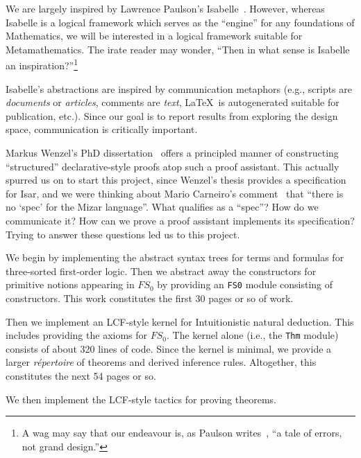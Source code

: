 \begin{node}
We are largely inspired by Lawrence Paulson's Isabelle~\cite{paulson1989foundation,paulson1990isabelle,paulson1994isabelle}.
However, whereas Isabelle is a logical framework which serves as the
``engine'' for any foundations of Mathematics, we will be interested
in a logical framework suitable for Metamathematics. The irate reader
may wonder, ``Then in what sense is Isabelle an
inspiration?''\footnote{A wag may say that our endeavour is, as
Paulson writes~\cite{paulson1990isabelle}, ``a tale of errors, not grand design.''}

Isabelle's abstractions are inspired by communication metaphors (e.g.,
scripts are \emph{documents} or \emph{articles}, comments are \emph{text}, 
\LaTeX\ is autogenerated suitable for publication, etc.). Since our
goal is to report results from exploring the design space,
communication is critically important.

Markus Wenzel's PhD dissertation~\cite{wenzel2002isabelle} offers a
principled manner of constructing ``structured'' declarative-style
proofs atop such a proof assistant. This actually spurred us on to
start this project, since Wenzel's thesis provides a specification for
Isar, and we were thinking about Mario Carneiro's
comment~\cite{carneiro2023reimplementing} that ``there is no `spec' for the Mizar language''.
What qualifies as a ``spec''? How do we communicate it? How can we
prove a proof assistant implements its specification? Trying to answer
these questions led us to this project.
\end{node}

\begin{node}
We begin by implementing the abstract syntax trees for terms and
formulas for three-sorted first-order logic. Then we abstract away the
constructors for primitive notions appearing in $FS_{0}$ by providing
an \texttt{FS0} module consisting of constructors. This work
constitutes the first 30 pages or so of work.

Then we implement an LCF-style kernel for Intuitionistic natural
deduction. This includes providing the axioms for $FS_{0}$. The kernel
alone (i.e., the \texttt{Thm} module) consists of about 320 lines of
code. Since the kernel is minimal, we provide a larger
\textit{r\'{e}pertoire} of theorems and derived inference
rules. Altogether, this constitutes the next 54 pages or so.

We then implement the LCF-style tactics for proving theorems. 
\end{node}

